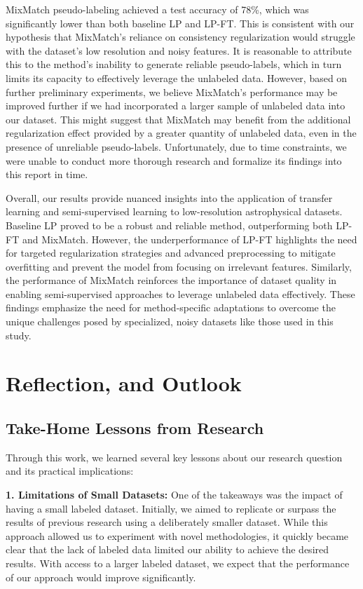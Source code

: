 \documentclass{article}
\begin{document}
MixMatch pseudo-labeling achieved a test accuracy of 78\%, which was significantly lower than both baseline LP and LP-FT. This is consistent with our hypothesis that MixMatch’s reliance on consistency regularization would struggle with the dataset's low resolution and noisy features. It is reasonable to attribute this to the method's inability to generate reliable pseudo-labels, which in turn limits its capacity to effectively leverage the unlabeled data.
However, based on further preliminary experiments, we believe MixMatch's performance may be improved further if we had incorporated a larger sample of unlabeled data into our dataset. This might suggest that MixMatch may benefit from the additional regularization effect provided by a greater quantity of unlabeled data, even in the presence of unreliable pseudo-labels. Unfortunately, due to time constraints, we were unable to conduct more thorough research and formalize its findings into this report in time.

Overall, our results provide nuanced insights into the application of transfer learning and semi-supervised learning to low-resolution astrophysical datasets. Baseline LP proved to be a robust and reliable method, outperforming both LP-FT and MixMatch. However, the underperformance of LP-FT highlights the need for targeted regularization strategies and advanced preprocessing to mitigate overfitting and prevent the model from focusing on irrelevant features. Similarly, the performance of MixMatch reinforces the importance of dataset quality in enabling semi-supervised approaches to leverage unlabeled data effectively. These findings emphasize the need for method-specific adaptations to overcome the unique challenges posed by specialized, noisy datasets like those used in this study.


\section{Reflection, and Outlook}

\subsection{Take-Home Lessons from Research}

Through this work, we learned several key lessons about our research question and its practical implications:

\textbf{1. Limitations of Small Datasets:}  
One of the takeaways was the impact of having a small labeled dataset. Initially, we aimed to replicate or surpass the results of previous research using a deliberately smaller dataset. While this approach allowed us to experiment with novel methodologies, it quickly became clear that the lack of labeled data limited our ability to achieve the desired results. With access to a larger labeled dataset, we expect that the performance of our approach would improve significantly.
\end{document}
